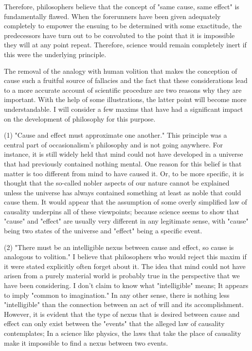 \documentclass[a4paper,12pt]{book}[2004/02/16]
\theoremstyle{ilemma}
\theoremstyle{itheorem}
\theoremstyle{iother}
\theoremstyle{icorollary}
\theoremstyle{numcorollary}
\theoremstyle{idefinition}
\begin{document}
Therefore, philosophers believe that the concept of "same cause, same effect" is fundamentally flawed. When the
forerunners have been given adequately completely to empower the
ensuing to be determined with some exactitude, the predecessors have
turn out to be convoluted to the point that it is impossible they will at any point repeat.
Therefore, science would remain completely inert if this were the underlying principle.

The removal of the analogy with human volition that makes the conception of cause such a fruitful source of fallacies and the fact that these considerations lead to a more accurate account of scientific procedure are two reasons why they are important. With the help of some illustrations, the latter point will become more understandable.
I will consider a few maxims that have had a significant impact on the development of philosophy for this purpose.

(1) "Cause and effect must approximate one another." This principle was a central part of occasionalism's philosophy and is not going anywhere. For instance, it is still widely held that mind could not have developed in a universe that had previously contained nothing mental. One reason for this belief is that matter is too different from mind to have caused it. Or, to be more specific, it is thought that the so-called nobler aspects of our nature cannot be explained unless the universe has always contained something at least as noble that could cause them. It would appear that the assumption of some overly simplified law of causality underpins all of these viewpoints; because science seems to show that "cause" and "effect" are usually very different in any legitimate sense, with "cause" being two states of the universe and "effect" being a specific event.

(2) "There must be an intelligible nexus between cause and effect, so cause is analogous to volition." I believe that philosophers who would reject this maxim if it were stated explicitly often forget about it. The idea that mind could not have arisen from a purely material world is probably true in the perspective that we have been considering. I don't claim to know what "intelligible" means; It appears to imply "common to imagination." In any other sense, there is nothing less "intelligible" than the connection between an act of will and its accomplishment. However, it is evident that the type of nexus that is desired between cause and effect can only exist between the "events" that the alleged law of causality contemplates; In a science like physics, the laws that take the place of causality make it impossible to find a nexus between two events.
\end{document}
